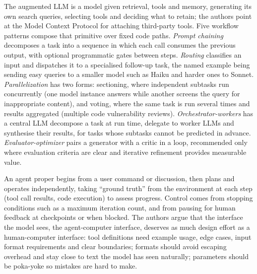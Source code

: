 The augmented LLM is a model given retrieval, tools and memory, generating its own search queries, selecting tools and deciding what to retain; the authors point at the Model Context Protocol for attaching third-party tools. Five workflow patterns compose that primitive over fixed code paths. \emph{Prompt chaining} decomposes a task into a sequence in which each call consumes the previous output, with optional programmatic gates between steps. \emph{Routing} classifies an input and dispatches it to a specialised follow-up task, the named example being sending easy queries to a smaller model such as Haiku and harder ones to Sonnet. \emph{Parallelization} has two forms: sectioning, where independent subtasks run concurrently (one model instance answers while another screens the query for inappropriate content), and voting, where the same task is run several times and results aggregated (multiple code vulnerability reviews). \emph{Orchestrator-workers} has a central LLM decompose a task at run time, delegate to worker LLMs and synthesise their results, for tasks whose subtasks cannot be predicted in advance. \emph{Evaluator-optimizer} pairs a generator with a critic in a loop, recommended only where evaluation criteria are clear and iterative refinement provides measurable value.

An agent proper begins from a user command or discussion, then plans and operates independently, taking ``ground truth'' from the environment at each step (tool call results, code execution) to assess progress. Control comes from stopping conditions such as a maximum iteration count, and from pausing for human feedback at checkpoints or when blocked. The authors argue that the interface the model sees, the agent-computer interface, deserves as much design effort as a human-computer interface: tool definitions need example usage, edge cases, input format requirements and clear boundaries; formats should avoid escaping overhead and stay close to text the model has seen naturally; parameters should be poka-yoke so mistakes are hard to make.

